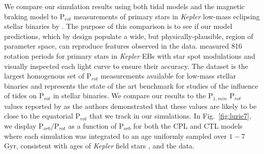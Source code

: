 \documentclass[twocolumn]{aastex61}
\newcommand{\kepler}[0]{\textit{Kepler}\xspace}
\begin{document}
We compare our simulation results using both tidal models and the \citet{Matt2015} magnetic braking model to P$_{rot}$ measurements of primary stars in \kepler low-mass eclipsing stellar binaries by \citet{Lurie2017}. The purpose of this comparison is to see if our model predictions, which by design populate a wide, but physically-plausible, region of parameter space, can reproduce features observed in the data.  \citet{Lurie2017} measured 816 rotation periods for primary stars in \kepler EBs with star spot modulations and visually inspected each light curve to ensure their accuracy. The \citet{Lurie2017} dataset is the largest homogenous set of P$_{rot}$ measurements available for low-mass stellar binaries and represents the state of the art benchmark for studies of the influence of tides on P$_{rot}$ in stellar binaries. We compare our results to the P$_{1,min}$ P$_{rot}$ values reported by \citet{Lurie2017} as the authors demonstrated that these values are likely to be close to the equatorial P$_{rot}$ that we track in our simulations. In Fig.~\ref{fig:lurie7}, we display P$_{orb}/$P$_{rot}$ as a function of P$_{orb}$ for both the CPL and CTL models where each simulation was integrated to an age uniformly sampled over $1-7$ Gyr, consistent with ages of \kepler field stars \citep{Chaplin2014}, and the \citet{Lurie2017} data. 
\end{document}
